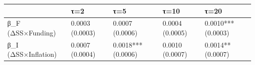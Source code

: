 \begin{tabular}{lllll}
\toprule
 & τ=2 & τ=5 & τ=10 & τ=20 \\
\midrule
β_F (ΔSS×Funding) & 0.0003
(0.0003) & 0.0007
(0.0006) & 0.0004
(0.0005) & 0.0010***
(0.0003) \\
β_I (ΔSS×Inflation) & 0.0007
(0.0004) & 0.0018***
(0.0006) & 0.0010
(0.0007) & 0.0014**
(0.0007) \\
\bottomrule
\end{tabular}
